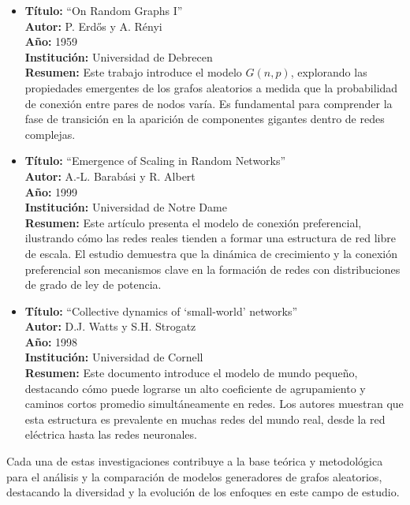 \documentclass[12pt]{book}
\begin{document}
\begin{itemize}
    \item \textbf{Título:} ``On Random Graphs I'' \\
    \textbf{Autor:} P. Erdős y A. Rényi \\
    \textbf{Año:} 1959 \\
    \textbf{Institución:} Universidad de Debrecen \\
    \textbf{Resumen:} Este trabajo introduce el modelo $G(n, p)$, explorando las propiedades emergentes de los grafos aleatorios a medida que la probabilidad de conexión entre pares de nodos varía. Es fundamental para comprender la fase de transición en la aparición de componentes gigantes dentro de redes complejas.

    \item \textbf{Título:} ``Emergence of Scaling in Random Networks'' \\
    \textbf{Autor:} A.-L. Barabási y R. Albert \\
    \textbf{Año:} 1999 \\
    \textbf{Institución:} Universidad de Notre Dame \\
    \textbf{Resumen:} Este artículo presenta el modelo de conexión preferencial, ilustrando cómo las redes reales tienden a formar una estructura de red libre de escala. El estudio demuestra que la dinámica de crecimiento y la conexión preferencial son mecanismos clave en la formación de redes con distribuciones de grado de ley de potencia.

    \item \textbf{Título:} ``Collective dynamics of ‘small-world’ networks'' \\
    \textbf{Autor:} D.J. Watts y S.H. Strogatz \\
    \textbf{Año:} 1998 \\
    \textbf{Institución:} Universidad de Cornell \\
    \textbf{Resumen:} Este documento introduce el modelo de mundo pequeño, destacando cómo puede lograrse un alto coeficiente de agrupamiento y caminos cortos promedio simultáneamente en redes. Los autores muestran que esta estructura es prevalente en muchas redes del mundo real, desde la red eléctrica hasta las redes neuronales.

\end{itemize}

Cada una de estas investigaciones contribuye a la base teórica y metodológica para el análisis y la comparación de modelos generadores de grafos aleatorios, destacando la diversidad y la evolución de los enfoques en este campo de estudio.
\end{document}
